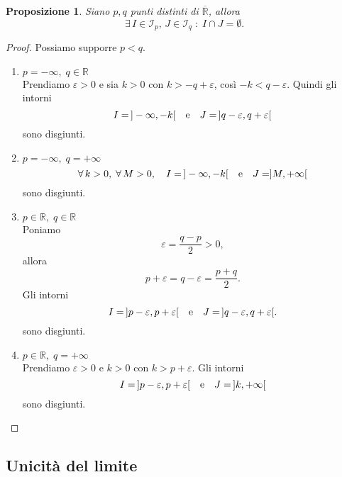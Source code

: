 \documentclass{article}
\theoremstyle{plain}
\newtheorem{prop}[thm]{Proposizione}
\theoremstyle{definition}
\theoremstyle{remark}
\begin{document}
\begin{bxthm}
\begin{prop}
    Siano $p,q$ punti distinti di $\overline{\mathbb{R}}$, allora
    \[\exists\,I\in \mathcal{I}_p,\,J\in \mathcal{I}_q\;:\; I\cap J=\emptyset.\]
\end{prop}
\end{bxthm}
\begin{proof}
    Possiamo supporre $p<q$.
    \begin{enumerate}
        \item[] $p=-\infty,\; q\in\mathbb{R}$ \\
        Prendiamo $\varepsilon>0$ e sia $k>0$ con $k>-q+\varepsilon$, così $-k<q-\varepsilon$.
        Quindi gli intorni 
        \[I=\,]-\infty,-k[\quad\textup{e}\quad J=\,]q-\varepsilon,q+\varepsilon[\] 
        sono disgiunti.\\
        \item[] $p=-\infty,\; q=+\infty$ \\
        \[\forall\, k>0,\;\forall\, M>0,\quad I=\,]-\infty,-k[\quad\textup{e}\quad J=]M,+\infty[\] 
        sono disgiunti.\\
        \item[] $p\in\mathbb{R},\; q\in\mathbb{R}$ \\
        Poniamo \[\varepsilon=\dfrac{q-p}{2}>0,\] allora \[p+\varepsilon=q-\varepsilon=\frac{p+q}{2}.\]
        Gli intorni 
        \[I=\,]p-\varepsilon,p+\varepsilon[\quad\textup{e}\quad J=\,]q-\varepsilon,q+\varepsilon[.\]
        sono disgiunti.\\
        \item[] $p\in\mathbb{R},\; q=+\infty$ \\
        Prendiamo $\varepsilon>0$ e $k>0$ con $k>p+\varepsilon$. Gli intorni 
        \[I=\,]p-\varepsilon,p+\varepsilon[\quad\textup{e}\quad J=\,]k,+\infty[\]
        sono disgiunti.
    \end{enumerate}
\end{proof}

\vspace{10pt}

\subsection{Unicità del limite}

\vspace{10pt}
\end{document}
